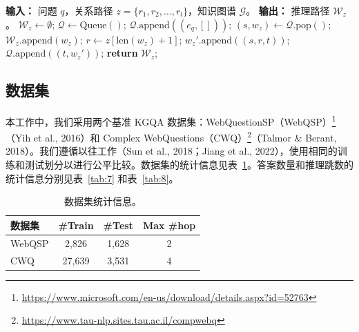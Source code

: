 \documentclass[11pt,UTF8,fontset=fandol]{ctexart}
\begin{document}
\begin{algorithm}[H]
\caption{基于关系路径检索推理路径}
\label{alg:1}
\begin{algorithmic}[1]
\State \textbf{输入：} 问题 $q$，关系路径 $z = \{r_1, r_2, \ldots, r_l\}$，知识图谱 $\mathcal{G}$。
\State \textbf{输出：} 推理路径 $\mathcal{W}_z$。
\State $\mathcal{W}_z \leftarrow \emptyset$;
\State $\mathcal{Q} \leftarrow \text{Queue}()$;
    \State $\mathcal{Q}.\text{append}((e_q, []))$; 
\EndFor
{}
    \State $(s, w_z) \leftarrow \mathcal{Q}.\text{pop}()$;
        \State $\mathcal{W}_z.\text{append}(w_z)$;
    \EndIf
        \State $r \leftarrow z[\text{len}(w_z) + 1]$; 
                \State $w_z'.\text{append}((s, r, t))$; 
                \State $\mathcal{Q}.\text{append}((t, w_z'))$;
            \EndIf
        \EndFor
    \EndIf
\EndWhile
\State \textbf{return} $\mathcal{W}_z$;
\end{algorithmic}
\end{algorithm}

\subsection{数据集}
\label{app:a4}

本工作中，我们采用两个基准 KGQA 数据集：WebQuestionSP（WebQSP）\footnote{\url{https://www.microsoft.com/en-us/download/details.aspx?id=52763}}（Yih et al., 2016）和 Complex WebQuestions（CWQ）\footnote{\url{https://www.tau-nlp.sites.tau.ac.il/compwebq}}（Talmor \& Berant, 2018）。我们遵循以往工作（Sun et al., 2018；Jiang et al., 2022），使用相同的训练和测试划分以进行公平比较。数据集的统计信息见表~\ref{tab:6}。答案数量和推理跳数的统计信息分别见表~\ref{tab:7} 和表~\ref{tab:8}。

\begin{table}[H]
\centering
\caption{数据集统计信息。}
\label{tab:6}
\begin{tabular}{lccc}
\toprule
数据集 & \#Train & \#Test & Max \#hop \\
\midrule
WebQSP & 2,826  & 1,628 & 2 \\
CWQ    & 27,639 & 3,531 & 4 \\
\bottomrule
\end{tabular}
\end{table}
\end{document}
